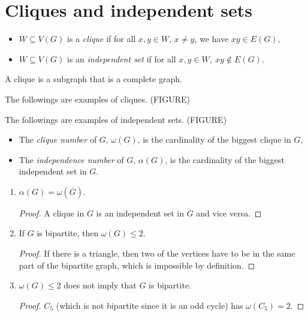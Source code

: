 \section{Cliques and independent sets}
\begin{definition}
\begin{itemize}
\item $W\subseteq V(G)$ is a \emph{clique} if for all $x,y\in W$, $x\neq y$, we have $xy\in E(G)$,
\item $W\subseteq V(G)$ is an \emph{independent set} if for all $x,y\in W, \ xy\notin E(G)$.
\end{itemize}
\end{definition}

\begin{remark} A clique is a subgraph that is a complete graph.
\end{remark}

\begin{example} The followings are examples of cliques.
(FIGURE)
\end{example}

\begin{example} The followings are examples of independent sets.
(FIGURE)
\end{example}

\begin{definition}
\begin{itemize}
\item The \emph{clique number} of $G$, $\omega(G)$, is the cardinality of the biggest clique in $G$,
\item The \emph{independence number} of $G$, $\alpha(G)$, is the cardinality of the biggest independent set in $G$.
\end{itemize}
\end{definition}

\begin{observation}
\begin{enumerate}
\item $\alpha(G)=\omega(\overline{G})$.
\begin{proof}
A clique in $G$ is an independent set in $\overline{G}$ and vice versa.
\end{proof}
\item If $G$ is bipartite, then $\omega(G)\leqslant 2$.
\begin{proof}
If there is a triangle, then two of the vertices have to be in the same part of the bipartite graph, which is impossible by definition.
\end{proof}
\item $\omega(G)\leqslant 2$ does not imply that $G$ is bipartite.
\begin{proof}
$C_5$ (which is not bipartite since it is an odd cycle) has $\omega(C_5)=2$.
\end{proof}
\end{enumerate}
\end{observation}

